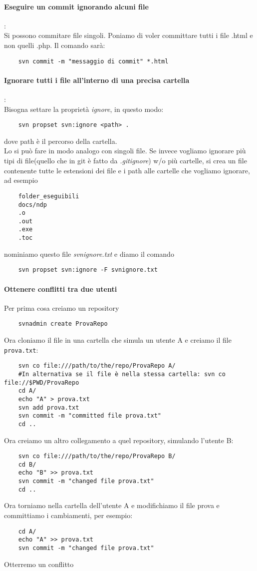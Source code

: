 \documentclass[a4paper]{article}
\begin{document}
	\paragraph{Eseguire un commit ignorando alcuni file}: \\
	Si possono commitare file singoli. Poniamo di voler committare tutti i file .html e non quelli .php. Il comando sarà:
	\begin{verbatim}
	svn commit -m "messaggio di commit" *.html
	\end{verbatim}
	\paragraph{Ignorare tutti i file all'interno di una precisa cartella}: \\
	Bisogna settare la proprietà \textit{ignore}, in questo modo:
	\begin{verbatim}
	svn propset svn:ignore <path> .
	\end{verbatim}
	dove path è il percorso della cartella.\\
	Lo si può fare in modo analogo con singoli file.
	Se invece vogliamo ignorare più tipi di file(quello che in git è fatto da \textit{.gitignore}) w/o più cartelle, si crea un file contenente tutte le estensioni dei file e i path alle cartelle che vogliamo ignorare, ad esempio
	\begin{verbatim}
	folder_eseguibili
	docs/ndp
	.o 
	.out
	.exe
	.toc 
	\end{verbatim}
	nominiamo questo file \textit{svnignore.txt} e diamo il comando
	\begin{verbatim}
	svn propset svn:ignore -F svnignore.txt
	\end{verbatim}

	\paragraph{Ottenere conflitti tra due utenti}
	Per prima cosa creiamo un repository
	\begin{verbatim}
	svnadmin create ProvaRepo
	\end{verbatim}
	Ora cloniamo il file in una cartella che simula un utente A e creiamo
	il file \verb|prova.txt|:
	\begin{verbatim}
	svn co file:///path/to/the/repo/ProvaRepo A/
	#In alternativa se il file è nella stessa cartella: svn co file://$PWD/ProvaRepo 
	cd A/
	echo "A" > prova.txt 
	svn add prova.txt
	svn commit -m "committed file prova.txt"
	cd ..
	\end{verbatim}
	Ora creiamo un altro collegamento a quel repository, simulando l'utente B:
	\begin{verbatim}
	svn co file:///path/to/the/repo/ProvaRepo B/
	cd B/
	echo "B" >> prova.txt
	svn commit -m "changed file prova.txt"
	cd ..
	\end{verbatim}
	Ora torniamo nella cartella dell'utente A e modifichiamo il file prova e 
	committiamo i cambiamenti, per esempio:
	\begin{verbatim}
	cd A/
	echo "A" >> prova.txt
	svn commit -m "changed file prova.txt"
	\end{verbatim}
	Otterremo un conflitto
\end{document}
